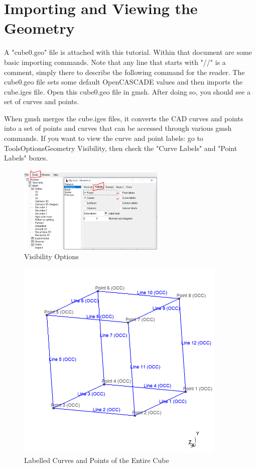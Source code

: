 \documentclass{report}
\begin{document}
\newpage
\section{Importing and Viewing the Geometry}
A "cube0.geo" file is attached with this tutorial. Within that document are some basic importing commands. Note that any line that starts with "//" is a comment, simply there to describe the following command for the reader. The cube0.geo file sets some default OpenCASCADE values and then imports the cube.iges file. Open this cube0.geo file in gmsh. After doing so, you should see a set of curves and points.

When gmsh merges the cube.iges files, it converts the CAD curves and points into a set of points and curves that can be accessed through various gmsh commands. If you want to view the curve and point labels: go to Tools\textrightarrow Options\textrightarrow Geometry \textrightarrow Visibility, then check the "Curve Labels" and "Point Labels" boxes.
\begin{figure}[h]
  \centering
  \includegraphics[width=7cm]{cube_visibility_options.png}
  \setcaptionwidth{8cm}
  \caption{Visibility Options}
  \label{cube_tech_ill}
\end{figure}

\begin{figure}[h]
  \centering
  \includegraphics[width=10cm]{cube_points_curves.png}
  \setcaptionwidth{15cm}
  \caption{Labelled Curves and Points of the Entire Cube}
  \label{Cube_P_C}
\end{figure}
\newpage
\end{document}
